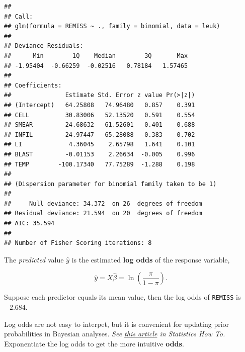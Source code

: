 \documentclass[
]{book}
\newenvironment{Shaded}{\begin{snugshade}}{\end{snugshade}}
\newcommand{\DataTypeTok}[1]{\textcolor[rgb]{0.13,0.29,0.53}{#1}}
\newcommand{\KeywordTok}[1]{\textcolor[rgb]{0.13,0.29,0.53}{\textbf{#1}}}
\newcommand{\NormalTok}[1]{#1}
\newcommand{\OperatorTok}[1]{\textcolor[rgb]{0.81,0.36,0.00}{\textbf{#1}}}
\newcommand{\StringTok}[1]{\textcolor[rgb]{0.31,0.60,0.02}{#1}}
\begin{document}
\begin{verbatim}
## 
## Call:
## glm(formula = REMISS ~ ., family = binomial, data = leuk)
## 
## Deviance Residuals: 
##      Min        1Q    Median        3Q       Max  
## -1.95404  -0.66259  -0.02516   0.78184   1.57465  
## 
## Coefficients:
##               Estimate Std. Error z value Pr(>|z|)
## (Intercept)   64.25808   74.96480   0.857    0.391
## CELL          30.83006   52.13520   0.591    0.554
## SMEAR         24.68632   61.52601   0.401    0.688
## INFIL        -24.97447   65.28088  -0.383    0.702
## LI             4.36045    2.65798   1.641    0.101
## BLAST         -0.01153    2.26634  -0.005    0.996
## TEMP        -100.17340   77.75289  -1.288    0.198
## 
## (Dispersion parameter for binomial family taken to be 1)
## 
##     Null deviance: 34.372  on 26  degrees of freedom
## Residual deviance: 21.594  on 20  degrees of freedom
## AIC: 35.594
## 
## Number of Fisher Scoring iterations: 8
\end{verbatim}

The \emph{predicted} value \(\hat{y}\) is the estimated \textbf{log odds} of the response variable,

\[\hat{y} = X \hat{\beta} = \ln (\frac{\pi}{1 - \pi}).\]

Suppose each predictor equals its mean value, then the log odds of \texttt{REMISS} is \(-2.684\).

\begin{Shaded}
\end{Shaded}

Log odds are not easy to interpet, but it is convenient for updating prior probabilities in Bayesian analyses. \emph{See \href{https://www.statisticshowto.datasciencecentral.com/log-odds/}{this article} in Statistics How To.} Exponentiate the log odds to get the more intuitive \textbf{odds}.
\end{document}
